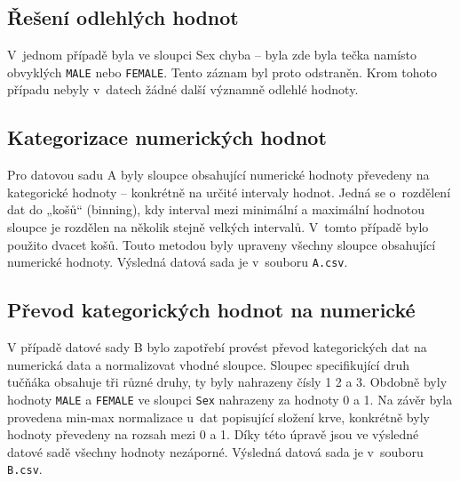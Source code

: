 \documentclass[10pt,xcolor=pdflatex,dvipsnames,table,oneside]{book}
\begin{document}
\subsection{Řešení odlehlých hodnot}
V~jednom případě byla ve sloupci Sex chyba – byla zde byla tečka namísto obvyklých \verb|MALE| nebo \verb|FEMALE|. Tento
záznam byl proto odstraněn. Krom tohoto případu nebyly v~datech žádné další významně odlehlé hodnoty.

\subsection{Kategorizace numerických hodnot}
Pro datovou sadu A byly sloupce obsahující numerické hodnoty převedeny na kategorické hodnoty – konkrétně na
určité intervaly hodnot. Jedná se o~rozdělení dat do „košů“ (binning), kdy interval mezi minimální a maximální
hodnotou sloupce je rozdělen na několik stejně velkých intervalů. V~tomto případě bylo použito dvacet košů.
Touto metodou byly upraveny všechny sloupce obsahující numerické hodnoty. Výsledná datová sada je v~souboru \verb|A.csv|.

\subsection{Převod kategorických hodnot na numerické}
V případě datové sady B bylo zapotřebí provést převod kategorických dat na numerická data a normalizovat
vhodné sloupce. Sloupec specifikující druh tučňáka obsahuje tři různé druhy, ty byly nahrazeny čísly 1 2 a 3.
Obdobně byly hodnoty \verb|MALE| a \verb|FEMALE| ve sloupci \verb|Sex| nahrazeny za hodnoty 0 a 1. Na závěr byla
provedena min-max normalizace u~dat popisující složení krve, konkrétně byly hodnoty převedeny na rozsah mezi 0 a 1.
Díky této úpravě jsou ve výsledné datové sadě všechny hodnoty nezáporné. Výsledná datová sada je v~souboru \verb|B.csv|.
\end{document}
